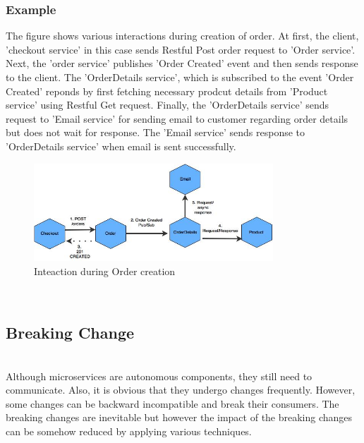 \subsubsection{Example}\label{section:challanges_of_microservices_architecture/integration/example}
The figure shows various interactions during creation of order. At first, the client, 'checkout service' in this case sends Restful Post order request to 'Order service'. Next, the 'order service' publishes 'Order Created' event and then sends response to the client. The 'OrderDetails service', which is subscribed to the event 'Order Created' reponds by first fetching necessary prodcut details from 'Product service' using Restful Get request. Finally, the 'OrderDetails service' sends request to 'Email service' for sending email to customer regarding order details but does not wait for response. The 'Email service' sends response to 'OrderDetails service' when email is sent successfully.
\begin{figure}[H]
\begin{center}
\includegraphics[width=0.8\textwidth]{figures/challanges_two_interaction_example}
\caption{Inteaction during Order creation}
\label{fig:challanges_of_microservices_architecture/integration/inter_service_communication/interaction_during_order_creation}
\end{center}
\end{figure}
\\
\subsection{Breaking Change}\label{section:challanges_of_microservices_architecture/integration/breaking_change}
\\
Although microservices are autonomous components, they still need to communicate. Also, it is obvious that they undergo changes frequently. However, some changes can be backward incompatible and break their consumers. The breaking changes are inevitable but however the impact of the breaking changes can be somehow reduced by applying various techniques. \cite{Newman:2015aa}

